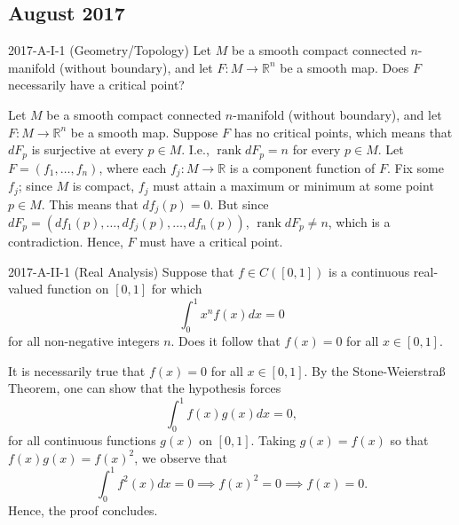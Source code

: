 \documentclass{article}
\begin{document}
\subsection{August 2017}
\begin{prb}{2017-A-I-1 (Geometry/Topology)}
	Let $M$ be a smooth compact connected $n$-manifold (without boundary), and let $F: M \to \mathbb{R}^{n}$ be a smooth map. Does $F$ necessarily have a critical point? 
\end{prb}
\begin{solutions}
	Let $M$ be a smooth compact connected $n$-manifold (without boundary), and let $F: M \to \mathbb{R}^{n}$ be a smooth map. Suppose $F$ has no critical points, which means that $dF_{p}$ is surjective at every $p \in M$. I.e., $\operatorname{rank}{dF_{p}} = n$ for every $p \in M$. Let $F = (f_{1}, \ldots, f_{n})$, where each $f_{j}: M \to \mathbb{R}$ is a component function of $F$. Fix some $f_{j}$; since $M$ is compact, $f_{j}$ must attain a maximum or minimum at some point $p \in M$. This means that $df_{j}(p) =0$. But since $dF_{p} = (df_{1}(p), \ldots, df_{j}(p), \ldots, df_{n}(p))$, $\operatorname{rank}{dF_{p}} \neq n$, which is a contradiction. Hence, $F$ must have a critical point. 
\end{solutions}
\begin{prb}{2017-A-II-1 (Real Analysis)}
	Suppose that $f \in C([0,1])$ is a continuous real-valued function on $[0,1]$ for which 
		\begin{equation*}
			\int_{0}^{1}x^{n}f(x)dx = 0
		\end{equation*}
	for all non-negative integers $n$. Does it follow that $f(x) = 0$ for all $x \in [0,1]$. 
\end{prb}
\begin{solutions}
	It is necessarily true that $f(x) =0$ for all $x \in [0,1]$. By the Stone-Weierstra{\ss} Theorem, one can show that the hypothesis forces 
		\begin{equation}
			\int_{0}^{1}f(x)g(x)dx = 0, 
		\end{equation} 
	for all continuous functions $g(x)$ on $[0,1]$. Taking $g(x) = f(x)$ so that $f(x)g(x) = f(x)^{2}$, we observe that 
		\begin{equation}
			\int_{0}^{1}f^{2}(x)dx = 0 \implies f(x)^{2} = 0 \implies f(x) =0. 
		\end{equation}
	Hence, the proof concludes. 
\end{solutions}
\end{document}
